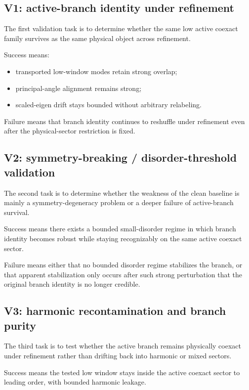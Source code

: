 \documentclass[11pt]{article}
\begin{document}
\subsection{V1: active-branch identity under refinement}

The first validation task is to determine whether the same low active coexact family survives as the same physical object across refinement.

Success means:
\begin{itemize}
\item transported low-window modes retain strong overlap;
\item principal-angle alignment remains strong;
\item scaled-eigen drift stays bounded without arbitrary relabeling.
\end{itemize}

Failure means that branch identity continues to reshuffle under refinement even after the physical-sector restriction is fixed.

\subsection{V2: symmetry-breaking / disorder-threshold validation}

The second task is to determine whether the weakness of the clean baseline is mainly a symmetry-degeneracy problem or a deeper failure of active-branch survival.

Success means there exists a bounded small-disorder regime in which branch identity becomes robust while staying recognizably on the same active coexact sector.

Failure means either that no bounded disorder regime stabilizes the branch, or that apparent stabilization only occurs after such strong perturbation that the original branch identity is no longer credible.

\subsection{V3: harmonic recontamination and branch purity}

The third task is to test whether the active branch remains physically coexact under refinement rather than drifting back into harmonic or mixed sectors.

Success means the tested low window stays inside the active coexact sector to leading order, with bounded harmonic leakage.
\end{document}
